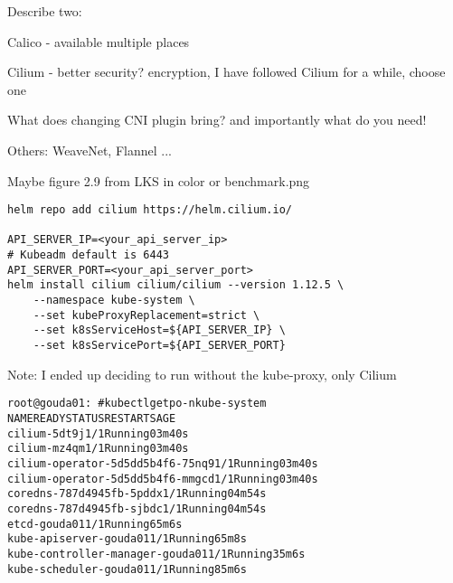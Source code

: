 \documentclass[Screen16to9,17pt]{foils}
\begin{document}

Describe two:
\begin{list2}
\item Calico - available multiple places
\item Cilium - better security? encryption, I have followed Cilium for a while, choose one
\item What does changing CNI plugin bring? and importantly what do you need!
\end{list2}



\begin{list2}
\item {}

\item Others: WeaveNet, Flannel ...

\item Maybe figure 2.9 from LKS in color or benchmark.png
\end{list2}


\begin{verbatim}
helm repo add cilium https://helm.cilium.io/

API_SERVER_IP=<your_api_server_ip>
# Kubeadm default is 6443
API_SERVER_PORT=<your_api_server_port>
helm install cilium cilium/cilium --version 1.12.5 \
    --namespace kube-system \
    --set kubeProxyReplacement=strict \
    --set k8sServiceHost=${API_SERVER_IP} \
    --set k8sServicePort=${API_SERVER_PORT}
\end{verbatim}

\begin{list2}
\item
\end{list2}
Note: I ended up deciding to run without the kube-proxy, only Cilium


\begin{alltt}
root@gouda01:~#  kubectl get po -n kube-system
NAME                               READY   STATUS    RESTARTS   AGE
cilium-5dt9j                       1/1     Running   0          3m40s
cilium-mz4qm                       1/1     Running   0          3m40s
cilium-operator-5d5dd5b4f6-75nq9   1/1     Running   0          3m40s
cilium-operator-5d5dd5b4f6-mmgcd   1/1     Running   0          3m40s
coredns-787d4945fb-5pddx           1/1     Running   0          4m54s
coredns-787d4945fb-sjbdc           1/1     Running   0          4m54s
etcd-gouda01                       1/1     Running   6          5m6s
kube-apiserver-gouda01             1/1     Running   6          5m8s
kube-controller-manager-gouda01    1/1     Running   3          5m6s
kube-scheduler-gouda01             1/1     Running   8          5m6s
\end{alltt}
\end{document}

